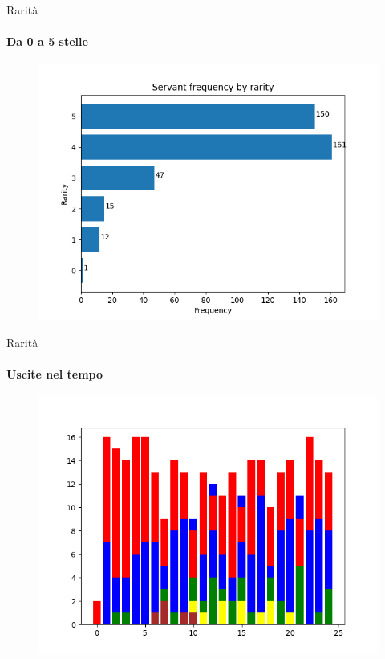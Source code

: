 \documentclass{beamer}
\begin{document}
\begin{darkframes}
  \begin{frame}{Rarità}
    \framesubtitle{Da 0 a 5 stelle}
    \begin{figure}
      \centering
      \includegraphics[scale=0.55]{./images/frequency_by_rarity.png}
    \end{figure}
  \end{frame}

  \begin{frame}{Rarità}
    \framesubtitle{Uscite nel tempo}
    \begin{figure}
      \centering
      \includegraphics[scale=0.55]{./images/rarity_per_year_bar.png}
    \end{figure}
  \end{frame}


\end{darkframes}
\end{document}
